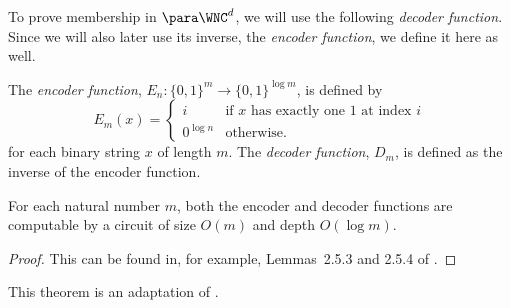 To prove membership in $\para \WNC^d$, we will use the following \emph{decoder function}.
Since we will also later use its inverse, the \emph{encoder function}, we define it here as well.

\begin{definition}\label{def:coding}
  The \emph{encoder function}, $E_n \colon \{0, 1\}^m \to \{0, 1\}^{\log m}$, is defined by
  \[
  E_m(x) =
  \begin{cases}
    i & \text{if } x \text{ has exactly one 1 at index } i \\
    0^{\log n} & \text{otherwise}.
  \end{cases}
  \]
  for each binary string $x$ of length $m$.
  The \emph{decoder function}, $D_m$, is defined as the inverse of the encoder function.
\end{definition}

\begin{lemma}\label{lem:codingbounds}
  For each natural number $m$, both the encoder and decoder functions are computable by a circuit of size $O(m)$ and depth $O(\log m)$.
\end{lemma}
\begin{proof}
  This can be found in, for example, Lemmas~2.5.3 and 2.5.4 of \autocite{savage98}.
\end{proof}

This theorem is an adaptation of \autocite[Lemma~3.3]{cc97lim}.

